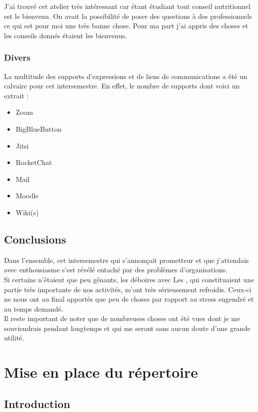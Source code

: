 {J'ai trouvé cet atelier très intéressant car étant étudiant tout conseil nutritionnel est le bienvenu. On avait la possibilité de poser des questions à des professionnels ce qui est pour moi une très bonne chose. Pour ma part j'ai appris des choses et les conseils donnés étaient les bienvenus.

\newpage
\section{Divers}

La multitude des supports d'expressions et de liens de communications a été un calvaire pour cet intersemestre. En effet, le nombre de supports dont voici un extrait : 

\begin{itemize}
    \item Zoom
    \item BigBlueButton
    \item Jitsi
    \item RocketChat
    \item Mail
    \item Moodle
    \item Wiki(s)
\end{itemize}


\chapter{Conclusions}

Dans l'ensemble, cet intersemestre  qui s'annonçait prometteur et que j'attendais avec enthousiasme s'est révélé entaché par des problèmes d'organisations.\\

Si certains n'étaient que peu gênants, les déboires avec Les \pd, qui constituaient une partie très importante de nos activités, m'ont très sérieusement refroidis. Ceux-ci ne nous ont au final apportés que peu de choses par rapport au stress engendré et au temps demandé.\\

Il reste important de noter que de nombreuses choses ont été vues dont je me souviendrais pendant longtemps et qui me seront sans aucun doute d'une grande utilité.\part{Mise en place du répertoire}

\chapter{Introduction}

}

